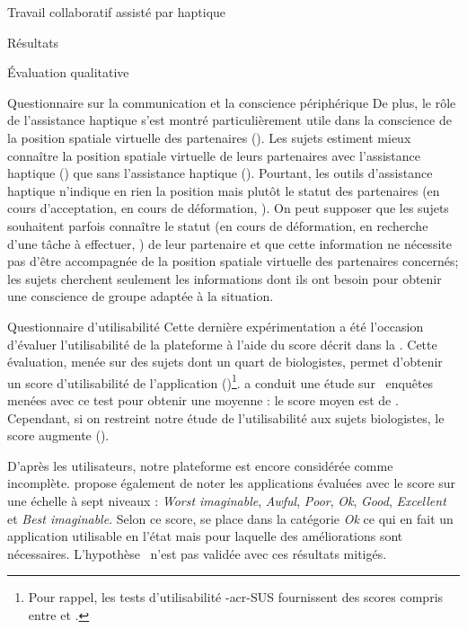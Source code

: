 \documentclass[myfrancais,ngerman,english,french]{mythesis}
\begin{document}
\begin{mychapter}{Travail collaboratif assisté par haptique}
\begin{mysection}{Résultats}
\begin{mysubsection}{Évaluation qualitative}
\begin{mysubsubsection}{Questionnaire sur la communication et la conscience périphérique}
					De plus, le rôle de l'assistance haptique s'est montré particulièrement utile dans la conscience de la position spatiale virtuelle des partenaires ().
					Les sujets estiment mieux connaître la position spatiale virtuelle de leurs partenaires avec l'assistance haptique () que sans l'assistance haptique ().
					Pourtant, les outils d'assistance haptique n'indique en rien la position mais plutôt le statut des partenaires (en cours d'acceptation, en cours de déformation, \myetc).
					On peut supposer que les sujets souhaitent parfois connaître le statut (en cours de déformation, en recherche d'une tâche à effectuer, \myetc) de leur partenaire et que cette information ne nécessite pas d'être accompagnée de la position spatiale virtuelle des partenaires concernés; les sujets cherchent seulement les informations dont ils ont besoin pour obtenir une conscience de groupe adaptée à la situation.
				\end{mysubsubsection}
				\begin{mysubsubsection}{Questionnaire d'utilisabilité}
					Cette dernière expérimentation a été l'occasion d'évaluer l'utilisabilité de la plateforme \myShaddock à l'aide du score  décrit dans la .
					Cette évaluation, menée sur des sujets dont un quart de biologistes, permet d'obtenir un score d'utilisabilité de l'application ()\footnote{Pour rappel, les tests d'utilisabilité \myacronl-{acr-SUS} fournissent des scores compris entre  et .}.
					 a conduit une étude sur ~enquêtes menées avec ce test pour obtenir une moyenne : le score moyen est de .
					Cependant, si on restreint notre étude de l'utilisabilité aux sujets biologistes, le score augmente ().

					D'après les utilisateurs, notre plateforme est encore considérée comme incomplète.
					 propose également de noter les applications évaluées avec le score  sur une échelle à sept niveaux : \textit{Worst imaginable}, \textit{Awful}, \textit{Poor}, \textit{Ok}, \textit{Good}, \textit{Excellent} et \textit{Best imaginable}.
					Selon ce score, \myShaddock se place dans la catégorie \textit{Ok} ce qui en fait un application utilisable en l'état mais pour laquelle des améliorations sont nécessaires.
					L'hypothèse~ n'est pas validée avec ces résultats mitigés.


\end{mysubsubsection}
\end{mysubsection}
\end{mysection}
\end{mychapter}
\end{document}
